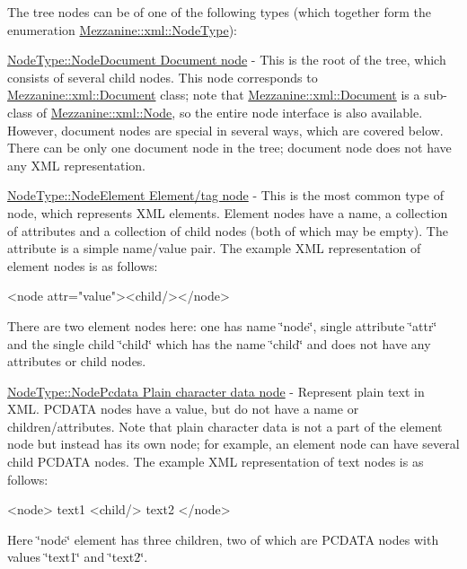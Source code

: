  \par
 The tree nodes can be of one of the following types (which together form the enumeration \hyperlink{namespaceMezzanine_1_1xml_a524d867e34ff408b8f45a51b7924cb80}{Mezzanine::xml::NodeType}):
\begin{DoxyItemize}
\item \hyperlink{namespaceMezzanine_1_1xml_a524d867e34ff408b8f45a51b7924cb80}{NodeType::NodeDocument Document node} -\/ This is the root of the tree, which consists of several child nodes. This node corresponds to \hyperlink{classMezzanine_1_1xml_1_1Document}{Mezzanine::xml::Document} class; note that \hyperlink{classMezzanine_1_1xml_1_1Document}{Mezzanine::xml::Document} is a sub-\/class of \hyperlink{classMezzanine_1_1xml_1_1Node}{Mezzanine::xml::Node}, so the entire node interface is also available. However, document nodes are special in several ways, which are covered below. There can be only one document node in the tree; document node does not have any XML representation. \par

\item \hyperlink{namespaceMezzanine_1_1xml_a524d867e34ff408b8f45a51b7924cb80}{NodeType::NodeElement Element/tag node} -\/ This is the most common type of node, which represents XML elements. Element nodes have a name, a collection of attributes and a collection of child nodes (both of which may be empty). The attribute is a simple name/value pair. The example XML representation of element nodes is as follows: 
\begin{DoxyCode}
 <node attr="value"><child/></node> 
\end{DoxyCode}
 There are two element nodes here: one has name \char`\"{}node\char`\"{}, single attribute \char`\"{}attr\char`\"{} and the single child \char`\"{}child\char`\"{} which has the name \char`\"{}child\char`\"{} and does not have any attributes or child nodes. \par

\item \hyperlink{namespaceMezzanine_1_1xml_a524d867e34ff408b8f45a51b7924cb80}{NodeType::NodePcdata Plain character data node} -\/ Represent plain text in XML. PCDATA nodes have a value, but do not have a name or children/attributes. Note that plain character data is not a part of the element node but instead has its own node; for example, an element node can have several child PCDATA nodes. The example XML representation of text nodes is as follows: 
\begin{DoxyCode}
 <node> text1 <child/> text2 </node> 
\end{DoxyCode}
 Here \char`\"{}node\char`\"{} element has three children, two of which are PCDATA nodes with values \char`\"{}text1\char`\"{} and \char`\"{}text2\char`\"{}. \par


\end{DoxyItemize}
